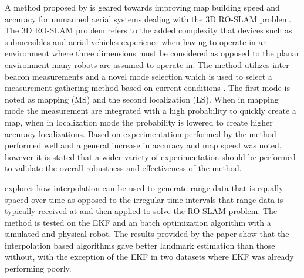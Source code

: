\documentclass[conference]{IEEEtran}
\begin{document}
	
	
	A method proposed by \cite{Dios2015} is geared towards improving map building speed and accuracy for unmanned aerial systems dealing with the 3D RO-SLAM problem. The 3D RO-SLAM problem refers to the added complexity that devices such as submersibles \cite{Newman} and aerial vehicles experience when having to operate in an environment where three dimensions must be considered as opposed to the planar environment many robots are assumed to operate in. The method utilizes inter-beacon measurements and a novel mode selection which is used to select a measurement gathering method based on current conditions \cite{Dios2015}. The first mode is noted as mapping (MS) and the second localization (LS). When in mapping mode the measurement are integrated with a high probability to quickly create a map, when in localization mode the probability is lowered to create higher accuracy localizations. Based on experimentation performed by \cite{Dios2015} the method performed well and a general increase in accuracy and map speed was noted, however it is stated that a wider variety of experimentation should be performed to validate the overall robustness and effectiveness of the method.
	
	
	
	
	\cite{Kehagias2006} explores how interpolation can be used to generate range data that is equally spaced over time as opposed to the irregular time intervals that range data is typically received at and then applied to solve the RO SLAM problem. The method is tested on the EKF and an batch optimization algorithm with a simulated and physical robot. The results provided by the paper show that the interpolation based algorithms gave better landmark estimation than those without, with the exception of the EKF in two datasets where EKF was already performing poorly.
	
	
	
	
	
\end{document}
